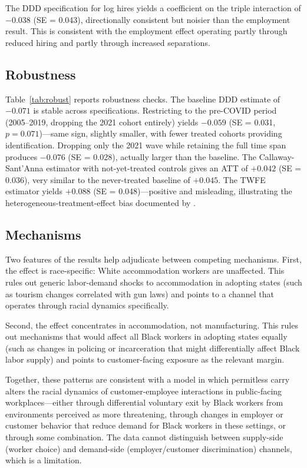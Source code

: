 \documentclass[12pt]{article}
\begin{document}
The DDD specification for log hires yields a coefficient on the triple interaction of $-0.038$ (SE = 0.043), directionally consistent but noisier than the employment result. This is consistent with the employment effect operating partly through reduced hiring and partly through increased separations.

\subsection{Robustness}



Table~\ref{tab:robust} reports robustness checks. The baseline DDD estimate of $-0.071$ is stable across specifications. Restricting to the pre-COVID period (2005--2019, dropping the 2021 cohort entirely) yields $-0.059$ (SE = 0.031, $p = 0.071$)---same sign, slightly smaller, with fewer treated cohorts providing identification. Dropping only the 2021 wave while retaining the full time span produces $-0.076$ (SE = 0.028), actually larger than the baseline. The Callaway-Sant'Anna estimator with not-yet-treated controls gives an ATT of $+0.042$ (SE = 0.036), very similar to the never-treated baseline of $+0.045$. The TWFE estimator yields $+0.088$ (SE = 0.048)---positive and misleading, illustrating the heterogeneous-treatment-effect bias documented by \citet{goodman2021difference}.

\subsection{Mechanisms}

Two features of the results help adjudicate between competing mechanisms. First, the effect is race-specific: White accommodation workers are unaffected. This rules out generic labor-demand shocks to accommodation in adopting states (such as tourism changes correlated with gun laws) and points to a channel that operates through racial dynamics specifically.

Second, the effect concentrates in accommodation, not manufacturing. This rules out mechanisms that would affect all Black workers in adopting states equally (such as changes in policing or incarceration that might differentially affect Black labor supply) and points to customer-facing exposure as the relevant margin.

Together, these patterns are consistent with a model in which permitless carry alters the racial dynamics of customer-employee interactions in public-facing workplaces---either through differential voluntary exit by Black workers from environments perceived as more threatening, through changes in employer or customer behavior that reduce demand for Black workers in these settings, or through some combination. The data cannot distinguish between supply-side (worker choice) and demand-side (employer/customer discrimination) channels, which is a limitation.
\end{document}
